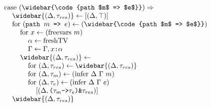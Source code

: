 \documentclass[acmsmall]{acmart}
\begin{document}
\begin{figure*}[h]
\[\begin{array}[t]{@{} l}
    \\

    \I \text{case } (\widebar{\code{path $m$ => $e$}})  \Rightarrow  
    \\
    \I\I \widebar{(\Delta, \tau_{res})} \leftarrow [(\Delta, \top)]
    \\
    \I\I \text{for } (\code{path $m$ => $e$}) \leftarrow (\widebar{\code{path $m$ => $e$}}) 
    \\
    \I\I\I \text{for } x \leftarrow (\text{freevars } m)
    \\
    \I\I\I\I \alpha \leftarrow \text{freshTV} 
    \\
    \I\I\I\I \Gamma \leftarrow \Gamma, \code{$x$:$\alpha$}
    \\
    \I\I\I \widebar{(\Delta, \tau_{res})} \leftarrow
    \\
    \I\I\I\I \text{for } (\Delta, \tau_{res}) \leftarrow \widebar{(\Delta, \tau_{res})} 
    \\
    \I\I\I\I \text{for } (\Delta, \tau_{m}) \leftarrow (\text{infer } \Delta\ \Gamma\ m) 
    \\
    \I\I\I\I \text{for } (\Delta, \tau_{e}) \leftarrow (\text{infer } \Delta\ \Gamma\ e) 
    \\
    \I\I\I\I\I [(\Delta, \code{($\tau_{m}$->$\tau_{e}$)\&$\tau_{res}$})]
    \\
    \I\I \widebar{(\Delta, \tau_{res})}

    \\


\end{array}\]
\end{figure*}
\end{document}

